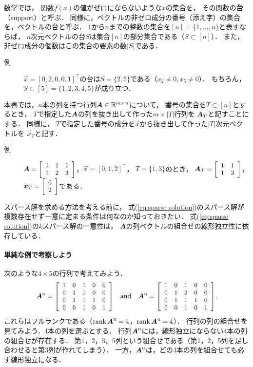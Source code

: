 数学では，
関数$f(x)$の値がゼロにならないような$x$の集合を，
その関数の{\bf 台}（support）と呼ぶ．
同様に，ベクトルの非ゼロ成分の番号（添え字）の集合を，ベクトルの台と呼ぶ．
$1$から$n$までの整数の集合を$[n]=\{1,\dots,n\}$と表すならば，
$n$次元ベクトルの台$S$は集合$[n]$の部分集合である（$S\subset[n]$）．
また，非ゼロ成分の個数はこの集合の要素の数$|S|$である．
\begin{description}
\item[例]
$\vec x=[0,2,0,0,1]^\top$の台は$S=\{2, 5\}$である（$x_2\neq 0,x_5\neq 0$）．
もちろん，$S\subset[5]=\{1,2,3,4,5\}$が成り立つ．
\end{description}

本書では，$n$本の列を持つ行列$\mtr A\in\mathbb{R}^{m\times n}$について，
番号の集合を$T\subset[n]$とするとき，
$T$で指定した$\mtr A$の列を抜き出して作った$m\times |T|$行列を
$\mtr A_T$と記すことにする．
同様に，
$T$で指定した番号の成分を$\vec x$から抜き出して作った$|T|$次元ベクトルを
$\vec x_T$と記す．
\begin{description}
\item[例]
$\mtr A=\smatrix{\small}{ccc}{1 & 1 & 1\\ 1 & 2 & 3}$，$\vec x=[0,1,2]^\top$，
$T=\{1, 3\}$のとき，
$\mtr A_T=\smatrix{\small}{cc}{1 & 1\\ 1 & 3}$，
$\vec x_T=\smatrix{\small}{c}{0\\ 2}$である．
\end{description}




スパース解を求める方法を考える前に，
式(\ref{eq:sparse solution})のスパース解が
複数存在せず一意に定まる条件は何なのか知っておきたい．
式(\ref{eq:sparse solution})の$k$スパース解の一意性は，
$\mtr A$の列ベクトルの組合せの線形独立性に依存している．


\paragraph{単純な例で考察しよう}

次のような$4\times 5$の行列で考えてみよう．
\begin{equation}
\mtr A\msup{n}=\smatrix{\small}{ccccc}
{
1 & 0 & 1 & 0 & 0\\
0 & 1 & 1 & 0 & 0\\
0 & 1 & 1 & 1 & 0\\
0 & 0 & 1 & 0 & 1}\quad\mbox{and}\quad
\mtr A\msup{u}=\smatrix{\small}{ccccc}
{
1 & 0 & 1 & 0 & 0\\
0 & 1 & 2 & 0 & 0\\
0 & 1 & 1 & 1 & 0\\
0 & 0 & 1 & 0 & 1}.
\label{eq:Spark4Spark5}
\end{equation}
これらはフルランクである（$\rank\mtr A\msup{n}=4$，$\rank\mtr A\msup{u}=4$）．
行列の列の組合せを見てみよう．4本の列を選ぶとする．
行列$\mtr A\msup{n}$には，線形独立にならない4本の列の組合せが存在する．
第1，2，3，5列という組合せである（第1，2，5列を足し合わせると第3列が作れてしまう）．
一方，$\mtr A\msup{u}$は，どの4本の列を組合せても必ず線形独立になる．

